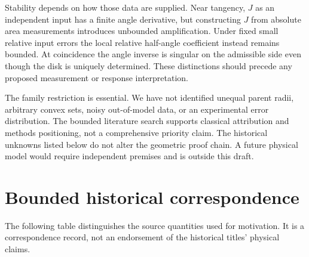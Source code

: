 \documentclass[11pt,a4paper]{article}
\theoremstyle{definition}
\begin{document}
Stability depends on how those data are supplied. Near tangency, \(J\) as an independent input has a finite angle derivative, but constructing \(J\) from absolute area measurements introduces unbounded amplification. Under fixed small relative input errors the local relative half-angle coefficient instead remains bounded. At coincidence the angle inverse is singular on the admissible side even though the disk is uniquely determined. These distinctions should precede any proposed measurement or response interpretation.

The family restriction is essential. We have not identified unequal parent radii, arbitrary convex sets, noisy out-of-model data, or an experimental error distribution. The bounded literature search supports classical attribution and methods positioning, not a comprehensive priority claim. The historical unknowns listed below do not alter the geometric proof chain. A future physical model would require independent premises and is outside this draft.

\appendix
\section{Bounded historical correspondence}\label{app:history}
The following table distinguishes the source quantities used for motivation. It is a correspondence record, not an endorsement of the historical titles' physical claims.
\end{document}
